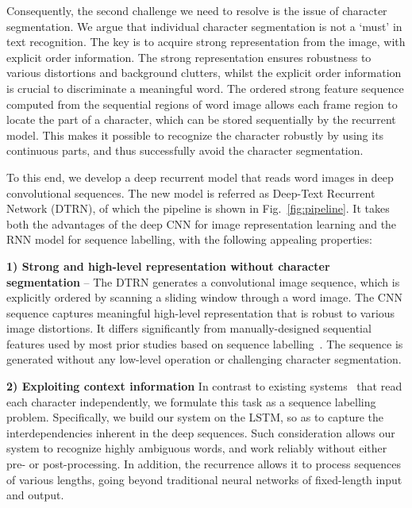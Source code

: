 \documentclass[letterpaper]{article}
\begin{document}
Consequently, the second challenge we need to resolve is the issue of character segmentation.
We argue that individual character segmentation is not a `must' in text recognition. The key is to acquire strong representation from the image, with explicit order information. The strong representation ensures robustness to various distortions and background clutters, whilst the explicit order information is crucial to discriminate a meaningful word.
The ordered strong feature sequence computed from the sequential regions of word image allows each frame region to locate the part of a character, which can be stored sequentially by the recurrent model. This makes it possible to recognize the character robustly by using its continuous parts, and thus successfully avoid the character segmentation.




To this end, we develop a deep recurrent model that reads word images in deep convolutional sequences. The new model is referred as Deep-Text Recurrent Network (DTRN), of which the pipeline is shown in Fig.~\ref{fig:pipeline}. It takes both the advantages of the deep CNN for image representation learning and the RNN model for sequence labelling, with the following appealing properties:

\noindent\textbf{1) Strong and high-level representation without character segmentation} --
The DTRN generates a convolutional image sequence, which is explicitly ordered by scanning a sliding window through a word image. The CNN sequence captures meaningful high-level representation that is robust to various image distortions. It differs significantly from manually-designed sequential features used by most prior studies based on sequence labelling~\cite{Breuel2013,Graves2009,Su2014}. The sequence is generated without any low-level operation or challenging character segmentation.

\noindent\textbf{2) Exploiting context information}
In contrast to existing systems~\cite{Bissacco2013,Jaderberg2014,Wang2012} that read each character independently, we formulate this task as a sequence labelling problem.
Specifically, we build our system on the LSTM, so as to capture the interdependencies inherent in the deep sequences. Such consideration allows our system to recognize highly ambiguous words, and work reliably without either pre- or post-processing. In addition, the recurrence allows it to process sequences of various lengths, going beyond traditional neural networks of fixed-length input and output.
\end{document}
